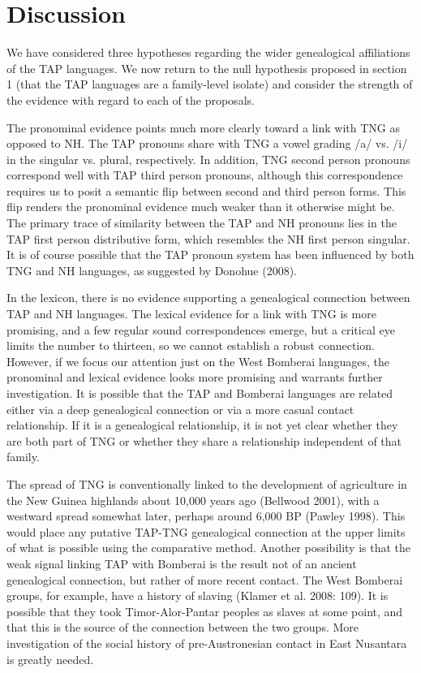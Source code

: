 \section[Discussion]{Discussion}
\hypertarget{RefHeading72090871885726}{}We have considered three hypotheses regarding the wider genealogical affiliations of the TAP languages. We now return to the null hypothesis proposed in section 1 (that the TAP languages are a family-level isolate) and consider the strength of the evidence with regard to each of the proposals.

The pronominal evidence points much more clearly toward a link with TNG as opposed to NH. The TAP pronouns share with TNG a vowel grading /a/ vs. /i/ in the singular vs. plural, respectively. In addition, TNG second person pronouns correspond well with TAP third person pronouns, although this correspondence requires us to posit a semantic flip between second and third person forms. This flip renders the pronominal evidence much weaker than it otherwise might be. The primary trace of similarity between the TAP and NH pronouns lies in the TAP first person distributive form, which resembles the NH first person singular. It is of course possible that the TAP pronoun system has been influenced by both TNG and NH languages, as suggested by Donohue (2008). 

In the lexicon, there is no evidence supporting a genealogical connection between TAP and NH languages. The lexical evidence for a link with TNG is more promising, and a few regular sound correspondences emerge, but a critical eye limits the number to thirteen, so we cannot establish a robust connection. However, if we focus our attention just on the West Bomberai languages, the pronominal and lexical evidence looks more promising and warrants further investigation. It is possible that the TAP and Bomberai languages are related either via a deep genealogical connection or via a more casual contact relationship. If it is a genealogical relationship, it is not yet clear whether they are both part of TNG or whether they share a relationship independent of that family. 

The spread of TNG is conventionally linked to the development of agriculture in the New Guinea highlands about 10,000 years ago (Bellwood 2001), with a westward spread somewhat later, perhaps around 6,000 BP (Pawley 1998). This would place any putative TAP-TNG genealogical connection at the upper limits of what is possible using the comparative method. Another possibility is that the weak signal linking TAP with Bomberai is the result not of an ancient genealogical connection, but rather of more recent contact. The West Bomberai groups, for example, have a history of slaving (Klamer et al. 2008: 109). It is possible that they took Timor-Alor-Pantar peoples as slaves at some point, and that this is the source of the connection between the two groups. More investigation of the social history of pre-Austronesian contact in East Nusantara is greatly needed.

